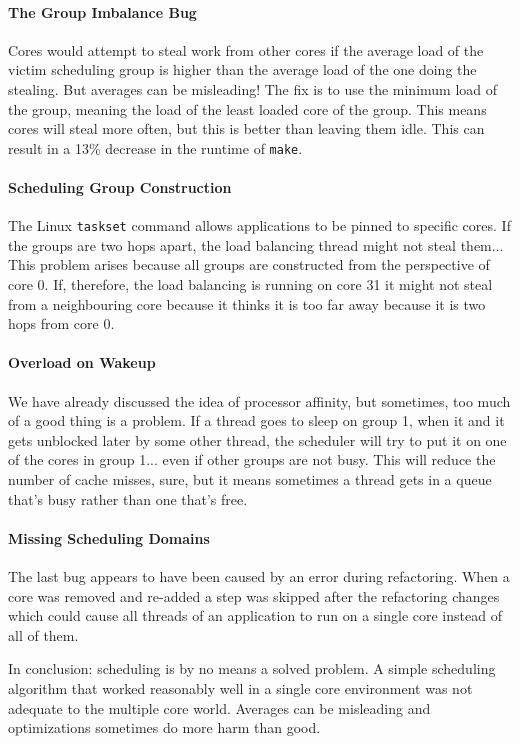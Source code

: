 \paragraph{The Group Imbalance Bug} Cores would attempt to steal work from other cores if the average load of the victim scheduling group is higher than the average load of the one doing the stealing. But averages can be misleading! The fix is to use the minimum load of the group, meaning the load of the least loaded core of the group. This means cores will steal more often, but this is better than leaving them idle. This can result in a 13\% decrease in the runtime of \texttt{make}.

\paragraph{Scheduling Group Construction} The Linux \texttt{taskset} command allows applications to be pinned to specific cores. If the groups are two hops apart, the load balancing thread might not steal them... This problem arises because all groups are constructed from the perspective of core 0. If, therefore, the load balancing is running on core 31 it might not steal from a neighbouring core because it thinks it is too far away because it is two hops from core 0.

\paragraph{Overload on Wakeup} We have already discussed the idea of processor affinity, but sometimes, too much of a good thing is a problem. If a thread goes to sleep on group 1, when it and it gets unblocked later by some other thread, the scheduler will try to put it on one of the cores in group 1... even if other groups are not busy. This will reduce the number of cache misses, sure, but it means sometimes a thread gets in a queue that's busy rather than one that's free.

\paragraph{Missing Scheduling Domains}
The last bug appears to have been caused by an error during refactoring. When a core was removed and re-added a step was skipped after the refactoring changes which could cause all threads of an application to run on a single core instead of all of them. 

In conclusion: scheduling is by no means a solved problem. A simple scheduling algorithm that worked reasonably well in a single core environment was not adequate to the multiple core world. Averages can be misleading and optimizations sometimes do more harm than good. 




